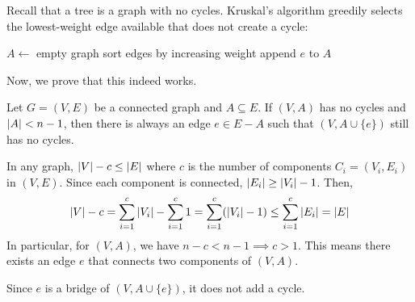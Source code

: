 Recall that a tree is a graph with no cycles.
Kruskal's algorithm greedily selects the lowest-weight edge available
that does not create a cycle:

\begin{algorithm}[H]
  \caption{\label{alg:g:mst1}}
  \begin{algorithmic}[1]
    \State $A \gets $ empty graph
    \State sort edges by increasing weight
        \State append $e$ to $A$
      \EndIf
    \EndFor
  \end{algorithmic}
\end{algorithm}

Now, we prove that this indeed works.

\begin{claim}
  Let $G = (V,E)$ be a connected graph and $A \subseteq E$.
  If $(V,A)$ has no cycles and $\abs{A} < n-1$,
  then there is always an edge $e \in E-A$ such that $(V,A \cup \{e\})$
  still has no cycles.
\end{claim}
\begin{prf}
  In any graph, $\abs{V} - c \leq \abs{E}$
  where $c$ is the number of components $C_i = (V_i,E_i)$ in $(V,E)$.
  Since each component is connected, $\abs{E_i} \geq \abs{V_i} - 1$. Then,
  \[
    \abs{V} - c
    = \sum_{i=1}^c \abs{V_i} - \sum_{i=1}^c 1
    = \sum_{i=1}^c (\abs{V_i} - 1)
    \leq \sum_{i=1}^c \abs{E_i} = \abs{E}
  \]
  In particular, for $(V,A)$, we have $n - c < n-1 \implies c > 1$.
  This means there exists an edge $e$ that connects two components of $(V,A)$.

  Since $e$ is a bridge of $(V, A\cup \{e\})$, it does not add a cycle.
\end{prf}

